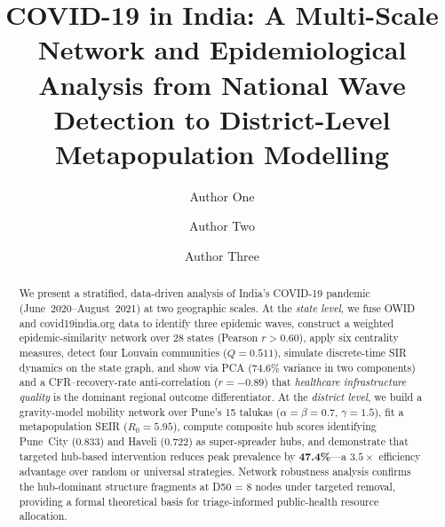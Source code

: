 \documentclass[sigconf,authordraft]{acmart}
\begin{document}
\title[COVID-19 India: Multi-Scale Network Analysis]{%
  COVID-19 in India: A Multi-Scale Network and Epidemiological Analysis
  from National Wave Detection to District-Level Metapopulation Modelling}

\author{Author One}

\author{Author Two}
\authornotemark[1]

\author{Author Three}
\authornotemark[1]

\renewcommand{\shortauthors}{Author One et al.}

\begin{abstract}
We present a stratified, data-driven analysis of India's COVID-19 pandemic
(June~2020--August~2021) at two geographic scales. At the
\emph{state level}, we fuse OWID and covid19india.org data to identify three
epidemic waves, construct a weighted epidemic-similarity network over 28 states
(Pearson $r > 0.60$), apply six centrality measures, detect four Louvain
communities ($Q = 0.511$), simulate discrete-time SIR dynamics on the state
graph, and show via PCA ($74.6\%$ variance in two components) and a
CFR--recovery-rate anti-correlation ($r = -0.89$) that \emph{healthcare
infrastructure quality} is the dominant regional outcome differentiator.
At the \emph{district level}, we build a gravity-model mobility network over
Pune's 15 talukas ($\alpha = \beta = 0.7$, $\gamma = 1.5$), fit a
metapopulation SEIR ($R_0 = 5.95$), compute composite hub scores identifying
Pune~City (0.833) and Haveli (0.722) as super-spreader hubs, and demonstrate
that targeted hub-based intervention reduces peak prevalence by
\textbf{47.4\%}---a $3.5\times$ efficiency advantage over random or universal
strategies. Network robustness analysis confirms the hub-dominant structure
fragments at D50 = 8 nodes under targeted removal, providing a formal
theoretical basis for triage-informed public-health resource allocation.
\end{abstract}
\end{document}
